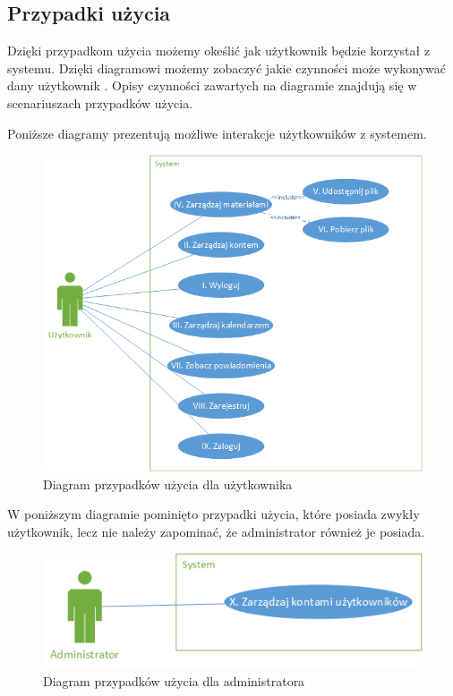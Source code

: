 \subsection{Przypadki użycia}
Dzięki przypadkom użycia możemy okeślić jak użytkownik będzie korzystał z systemu. Dzięki diagramowi możemy zobaczyć jakie czynności może wykonywać dany użytkownik \cite{DOC03}. Opisy czynności zawartych na diagramie znajdują się w scenariuszach przypadków użycia.

Poniższe diagramy prezentują możliwe interakcje użytkowników z systemem.
\begin{figure}[h]
	\centering
	\includegraphics[scale=0.7]{UseCaseUser}
	\caption{\label{fig:caption_01}Diagram przypadków użycia dla użytkownika}
\end{figure}
W poniższym diagramie pominięto przypadki użycia, które posiada zwykły użytkownik, lecz nie należy zapominać, że administrator również je posiada.
\begin{figure}[h]
	\centering
	\includegraphics[scale=0.7]{UseCaseAdmin}
	\caption{\label{fig:caption_01}Diagram przypadków użycia dla administratora}
\end{figure}

